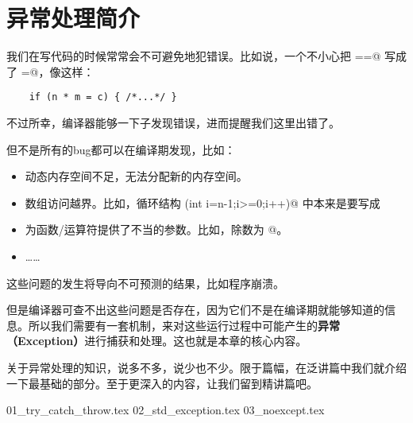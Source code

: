 \chapter{异常处理简介}
我们在写代码的时候常常会不可避免地犯错误。比如说，一个不小心把 \lstinline@==@ 写成了 \lstinline@=@，像这样：
\begin{lstlisting}
    if (n * m = c) { /*...*/ }
\end{lstlisting}
不过所幸，编译器能够一下子发现错误，进而提醒我们这里出错了。\par
但不是所有的bug都可以在编译期发现，比如：
\begin{itemize}
    \item 动态内存空间不足，无法分配新的内存空间。
    \item 数组访问越界。比如，循环结构 \lstinline@\for(int i=n-1;i>=0;i++)@ 中本来是要写成
    \item 为函数/运算符提供了不当的参数。比如，除数为 @。
    \item ……
\end{itemize}
这些问题的发生将导向不可预测的结果，比如程序崩溃。\par
但是编译器可查不出这些问题是否存在，因为它们不是在编译期就能够知道的信息。所以我们需要有一套机制，来对这些运行过程中可能产生的\textbf{异常（Exception）}进行捕获和处理。这也就是本章的核心内容。\par
关于异常处理的知识，说多不多，说少也不少。限于篇幅，在泛讲篇中我们就介绍一下最基础的部分。至于更深入的内容，让我们留到精讲篇吧。\par
{01_try_catch_throw.tex}
{02_std_exception.tex}
{03_noexcept.tex}